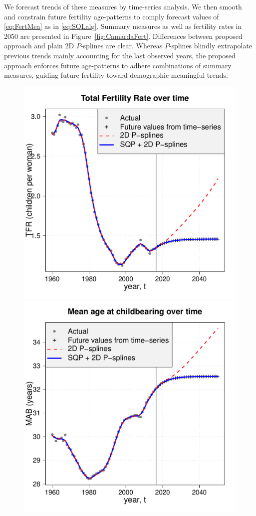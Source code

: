 \documentclass[12pt,a4paper,twoside]{article}
\begin{document}
We forecast trends of these measures by time-series analysis. We then smooth and constrain future fertility age-patterns to comply forecast values of \eqref{eq:FertMea} as in \eqref{eq:SQLalg}. Summary measures as well as fertility rates in 2050 are presented in Figure~\ref{fig:CamardaFert}. Differences between proposed approach and plain 2D $P$-splines are clear. Whereas $P$-splines blindly extrapolate previous trends mainly accounting for the last observed years, the proposed approach enforces future age-patterns to adhere combinations of summary measures, guiding future fertility toward demographic meaningful trends. 

\begin{figure}[!ht]\centering
	\includegraphics[scale=0.35]{./Figures/Camardafig2a.pdf}
	\includegraphics[scale=0.35]{./Figures/Camardafig2b.pdf}

\end{figure}
\end{document}
